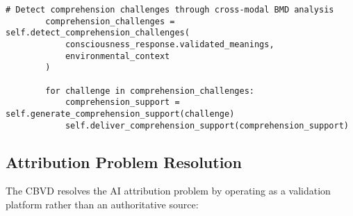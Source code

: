 \documentclass[12pt,a4paper]{article}
\begin{document}
\begin{lstlisting}[style=pythonstyle, caption=Real-Time Environmental Consciousness Participation]
        # Detect comprehension challenges through cross-modal BMD analysis
        comprehension_challenges = self.detect_comprehension_challenges(
            consciousness_response.validated_meanings,
            environmental_context
        )
        
        for challenge in comprehension_challenges:
            comprehension_support = self.generate_comprehension_support(challenge)
            self.deliver_comprehension_support(comprehension_support)
\end{lstlisting}

\subsection{Attribution Problem Resolution}

The CBVD resolves the AI attribution problem by operating as a validation platform rather than an authoritative source:
\end{document}
